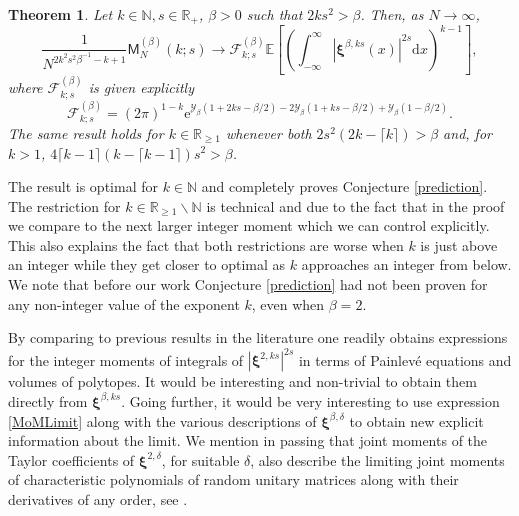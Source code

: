 \documentclass[]{article}
\newtheorem{thm}{Theorem}[section]
\begin{document}
\begin{thm}\label{MainThm1}
 Let $k\in \mathbb{N}, s\in \mathbb{R}_+$, $\beta >0$ such that $2ks^2>\beta$. Then, as $N \to \infty$,
 \begin{equation}\label{MoMLimit}
\frac{1}{N^{2k^2s^2\beta^{-1}-k+1}}\mathsf{M}^{(\beta)}_N(k;s)\longrightarrow \mathcal{F}^{(\beta)}_{k;s}\mathbb{E}\left[\left(\int_{-\infty}^\infty \left|\boldsymbol{\xi}^{\beta,ks}(x)\right|^{2s}\mathrm{d}x\right)^{k-1}\right],
 \end{equation}
where $\mathcal{F}^{(\beta)}_{k;s}$ is given explicitly 
 \begin{equation}
    \mathcal{F}^{(\beta)}_{k;s}=(2\pi)^{1-k}\mathrm{e}^{\mathcal{Y}_\beta\left(1+2ks-\beta/2\right)-2\mathcal{Y}_\beta \left(1+ks-\beta/2\right)+\mathcal{Y}_\beta(1-\beta/2)}.
 \end{equation}
 The same result holds for $k \in \mathbb{R}_{\ge 1}$ whenever both $2s^2(2k-\lceil k \rceil)>\beta$ and, for $k>1$, $4\lceil k-1\rceil(k-\lceil k-1\rceil)s^2>\beta$.
\end{thm}
The result is optimal for $k \in \mathbb{N}$ and completely proves Conjecture \ref{prediction}. The restriction for $k \in \mathbb{R}_{\ge 1}\backslash\mathbb{N}$ is technical and due to the fact that in the proof we compare to the next larger integer moment which we can control explicitly. This also explains the fact that both restrictions are worse when $k$ is just above an integer while they get closer to optimal as $k$ approaches an integer from below. We note that before our work Conjecture \ref{prediction} had not been proven for any non-integer value of the exponent $k$, even when $\beta=2$.

By comparing to previous results in the literature \cite{ClaeysKrasovsky,KRRR, AssiotisKeatingMoM, BaileyKeatingMoM,BaileyKeatingSurvey,Fahs,MoMCbetaE} one readily obtains expressions for the integer moments of integrals of $ |\boldsymbol{\xi}^{2,ks}|^{2s}$ in terms of Painlev\'{e} equations and volumes of polytopes. It would be interesting and non-trivial to obtain them directly from $\boldsymbol{\xi}^{\beta,ks}$. Going further, it would be very interesting to use expression \eqref{MoMLimit} along with the various descriptions of $\boldsymbol{\xi}^{\beta,\delta}$ to obtain new explicit information about the limit. We mention in passing that joint moments of the Taylor coefficients of $\boldsymbol{\xi}^{2,\delta}$, for suitable $\delta$, also describe the limiting joint moments of characteristic polynomials of random unitary matrices along with their derivatives of any order, see \cite{AKW,ABGS,AGKW}.
\end{document}
